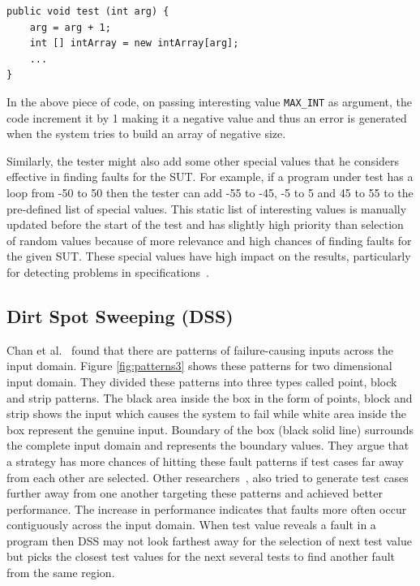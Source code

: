 \begin{lstlisting}
public void test (int arg) {
	arg = arg + 1;
	int [] intArray = new intArray[arg];
	...
}
\end{lstlisting}

In the above piece of code, on passing interesting value \verb+MAX_INT+ as argument, the code increment it by 1 making it a negative value and thus an error is generated when the system tries to build an array of negative size. 

Similarly, the tester might also add some other special values that he considers effective in finding faults for the SUT. For example, if a program under test has a loop from -50 to 50 then the tester can add -55 to -45, -5 to 5 and 45 to 55 to the pre-defined list of special values. This static list of interesting values is manually updated before the start of the test and has slightly high priority than selection of random values because of more relevance and high chances of finding faults for the given SUT. These special values have high impact on the results, particularly for detecting problems in specifications~\cite{ciupa2008finding}.


\subsection{Dirt Spot Sweeping (DSS)}
Chan et al.~\cite{chan1996proportional} found that there are patterns of failure-causing inputs across the input domain. Figure \ref{fig:patterns3} shows these patterns for two dimensional input domain. They divided these patterns into three types called point, block and strip patterns. The black area inside the box in the form of points, block and strip shows the input which causes the system to fail while white area inside the box represent the genuine input. Boundary of the box (black solid line) surrounds the complete input domain and represents the boundary values. They argue that a strategy has more chances of hitting these fault patterns if test cases far away from each other are selected. Other researchers~\cite{chan2003normalized, chen2004mirror, chen2007quasi}, also tried to generate test cases further away from one another targeting these patterns and achieved better performance. The increase in performance indicates that faults more often occur contiguously across the input domain. When test value reveals a fault in a program then DSS may not look farthest away for the selection of next test value but picks the closest test values for the next several tests to find another fault from the same region.

